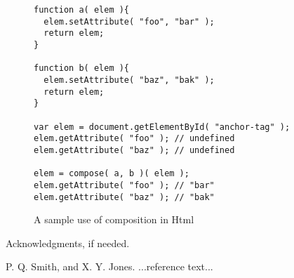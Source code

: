 \documentclass[preprint]{sigplanconf}
\begin{document}
\begin{figure}[h!]
\begin{verbatim}
function a( elem ){
  elem.setAttribute( "foo", "bar" );
  return elem;
}

function b( elem ){
  elem.setAttribute( "baz", "bak" );
  return elem;
}

var elem = document.getElementById( "anchor-tag" );
elem.getAttribute( "foo" ); // undefined
elem.getAttribute( "baz" ); // undefined

elem = compose( a, b )( elem );
elem.getAttribute( "foo" ); // "bar"
elem.getAttribute( "baz" ); // "bak"
\end{verbatim}
\nocaptionrule \caption{A sample use of composition in Html}
\end{figure}


\acks

Acknowledgments, if needed.





\begin{thebibliography}{}
\softraggedright

P. Q. Smith, and X. Y. Jones. ...reference text...

\end{thebibliography}
\end{document}
